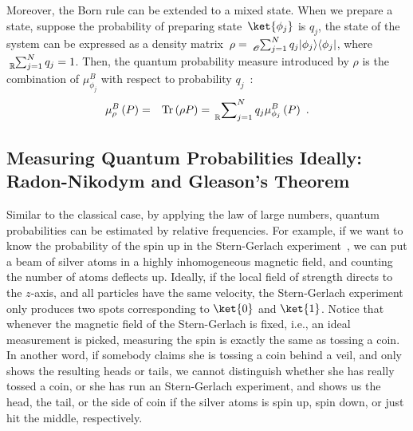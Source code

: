 \documentclass{article}
\theoremstyle{remark}
\newcommand{\proj}[1]{|#1 \rangle\langle #1 |}
\newcommand{\Tr}{\mathop{\mathrm{Tr}}\nolimits}
\begin{document}
Moreover, the Born rule can be extended to a mixed state. When we
prepare a state, suppose the probability of preparing state~$\ket{\phi_{j}}$
is $q_{j}$, the state of the system can be expressed as a density
matrix~$\rho=\tensor*[_{\mathscr{O}}]{\sum}{_{j=1}^{N}}q_{j}\proj{\phi_{j}}$,
where $\tensor*[_{\mathbb{R}}]{\sum}{_{j=1}^{N}}q_{j}=1$. Then, the
quantum probability measure introduced by $\rho$ is the combination
of $\mu_{\phi_{j}}^{B}$ with respect to probability $q_{j}$~\cite{peres1995quantum,544199,RiederSvozil2007}:
\begin{eqnarray}
\mu_{\rho}^{B}\left(P\right) & = & \Tr\left(\rho P\right)=\sideset{_{\mathbb{R}}}{_{j=1}^{N}}\sum q_{j}\mu_{\phi_{j}}^{B}\left(P\right)\textrm{ .}\label{BornRule.mixed}
\end{eqnarray}



\subsection{Measuring Quantum Probabilities Ideally: Radon-Nikodym and Gleason's
Theorem}

Similar to the classical case, by applying the law of large numbers,
quantum probabilities can be estimated by relative frequencies. For
example, if we want to know the probability of the spin up in the
Stern-Gerlach experiment~\cite{Stern1988,peres1995quantum,544199,Griffiths2003},
we can put a beam of silver atoms in a highly inhomogeneous magnetic
field, and counting the number of atoms deflects up. Ideally, if the
local field of strength directs to the $z$-axis, and all particles
have the same velocity, the Stern-Gerlach experiment only produces
two spots corresponding to $\ket{0}$ and $\ket{1}$. Notice that
whenever the magnetic field of the Stern-Gerlach is fixed, i.e., an
ideal measurement is picked, measuring the spin is exactly the same
as tossing a coin. In another word, if somebody claims she is tossing
a coin behind a veil, and only shows the resulting heads or tails,
we cannot distinguish whether she has really tossed a coin, or she
has run an Stern-Gerlach experiment, and shows us the head, the tail,
or the side of coin if the silver atoms is spin up, spin down, or
just hit the middle, respectively.
\end{document}
